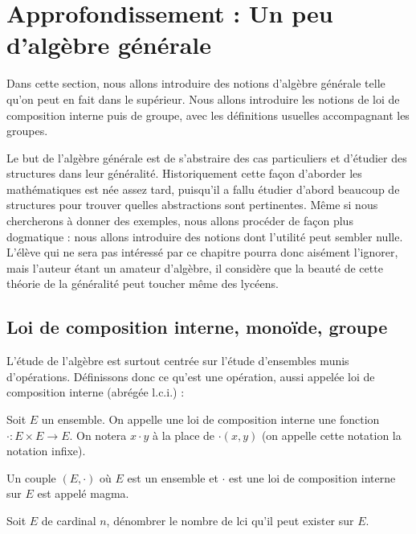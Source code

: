 \section{Approfondissement : Un peu d'algèbre générale}

Dans cette section, nous allons introduire des notions d'algèbre générale telle qu'on peut en fait dans le supérieur. Nous allons introduire les notions de loi de composition interne puis de groupe, avec les définitions usuelles accompagnant les groupes.

Le but de l'algèbre générale est de s'abstraire des cas particuliers et d'étudier des structures dans leur généralité. Historiquement cette façon d'aborder les mathématiques est née assez tard, puisqu'il a fallu étudier d'abord beaucoup de structures pour trouver quelles abstractions sont pertinentes. Même si nous chercherons à donner des exemples, nous allons procéder de façon plus dogmatique : nous allons introduire des notions dont l'utilité peut sembler nulle. L'élève qui ne sera pas intéressé par ce chapitre pourra donc aisément l'ignorer, mais l'auteur étant un amateur d'algèbre, il considère que la beauté de cette théorie de la généralité peut toucher même des lycéens.

\subsection{Loi de composition interne, monoïde, groupe}

L'étude de l'algèbre est surtout centrée sur l'étude d'ensembles munis d'opérations. Définissons donc ce qu'est une opération, aussi appelée loi de composition interne (abrégée l.c.i.) :

\begin{defi}
    Soit $E$ un ensemble. On appelle une loi de composition interne une fonction $\cdot : E \times E \to E$. On notera $x\cdot y$ à la place de $\cdot(x,y)$ (on appelle cette notation la notation infixe).

    Un couple $(E,\cdot)$ où $E$ est un ensemble et $\cdot$ est une loi de composition interne sur $E$ est appelé magma.
\end{defi}

\begin{exo}
    Soit $E$ de cardinal $n$, dénombrer le nombre de lci qu'il peut exister sur $E$.
\end{exo}

